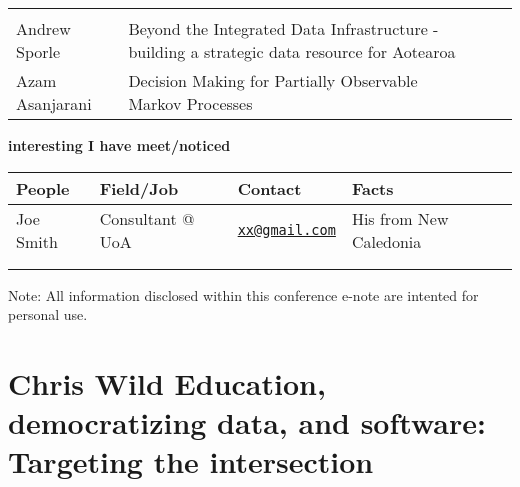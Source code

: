 \documentclass[
]{book}
\begin{document}
\begin{longtable}[]{@{}llll@{}}
\begin{minipage}[t]{0.22\columnwidth}
\strut
\end{minipage}\tabularnewline
\begin{minipage}[t]{0.22\columnwidth}\raggedright
Andrew Sporle\strut
\end{minipage} & \begin{minipage}[t]{0.22\columnwidth}\raggedright
Beyond the Integrated Data Infrastructure - building a strategic data resource for Aotearoa\strut
\end{minipage} & \begin{minipage}[t]{0.22\columnwidth}\raggedright
\strut
\end{minipage} & \begin{minipage}[t]{0.22\columnwidth}\raggedright
\strut
\end{minipage}\tabularnewline
\begin{minipage}[t]{0.22\columnwidth}\raggedright
Azam Asanjarani\strut
\end{minipage} & \begin{minipage}[t]{0.22\columnwidth}\raggedright
Decision Making for Partially Observable Markov Processes\strut
\end{minipage} & \begin{minipage}[t]{0.22\columnwidth}\raggedright
\strut
\end{minipage} & \begin{minipage}[t]{0.22\columnwidth}\raggedright
\strut
\end{minipage}\tabularnewline
\bottomrule
\end{longtable}

\textbf{interesting I have meet/noticed}

\begin{longtable}[]{@{}llll@{}}
\toprule
People & Field/Job & Contact & Facts\tabularnewline
\midrule
\endhead
Joe Smith & Consultant @ UoA & \href{mailto:xx@gmail.com}{\nolinkurl{xx@gmail.com}} & His from New Caledonia\tabularnewline
& & &\tabularnewline
& & &\tabularnewline
\bottomrule
\end{longtable}

Note: All information disclosed within this conference e-note are intented for personal use.

\hypertarget{chris-wild-education-democratizing-data-and-software-targeting-the-intersection}{%
\chapter*{Chris Wild \textbar{} Education, democratizing data, and software: Targeting the intersection}\label{chris-wild-education-democratizing-data-and-software-targeting-the-intersection}}
\end{document}
